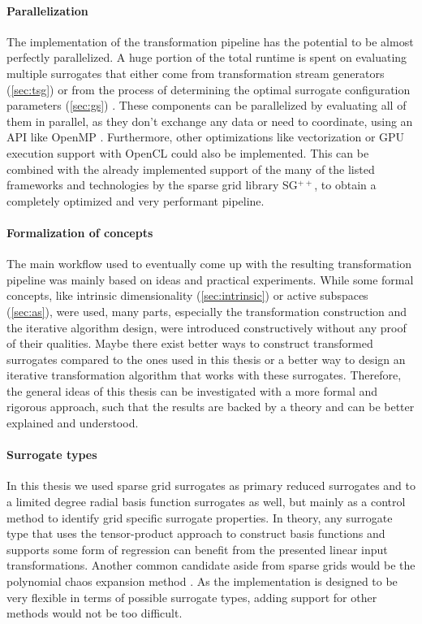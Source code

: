 \documentclass[
  a4paper,  %
  twoside,  %
  bibliography=totoc,
  headsepline,
  cleardoublepage=empty,
  parskip=half,
  draft=false
]{scrbook}
\begin{document}
\paragraph{Parallelization}
The implementation of the transformation pipeline has the potential to be almost perfectly parallelized.
A huge portion of the total runtime is spent on evaluating multiple surrogates that either come from transformation stream generators (\cref{sec:tsg}) or from the process of determining the optimal surrogate configuration parameters (\cref{sec:gs}) .
These components can be parallelized by evaluating all of them in parallel, as they don't exchange any data or need to coordinate, using an API like OpenMP \cite{openmp08}.
Furthermore, other optimizations like vectorization \cite{Maleki2011} or GPU execution support with OpenCL \cite{Stone2010} could also be implemented.
This can be combined with the already implemented support of the many of the listed frameworks and technologies by the sparse grid library SG$^{++}$, to obtain a completely optimized and very performant pipeline.

\paragraph{Formalization of concepts}
The main workflow used to eventually come up with the resulting transformation pipeline was mainly based on ideas and practical experiments.
While some formal concepts, like intrinsic dimensionality (\cref{sec:intrinsic}) or active subspaces (\cref{sec:as}), were used, many parts, especially the transformation construction and the iterative algorithm design, were introduced constructively without any proof of their qualities.
Maybe there exist better ways to construct transformed surrogates compared to the ones used in this thesis or a better way to design an iterative transformation algorithm that works with these surrogates.
Therefore, the general ideas of this thesis can be investigated with a more formal and rigorous approach, such that the results are backed by a theory and can be better explained and understood.

\paragraph{Surrogate types}
In this thesis we used sparse grid surrogates as primary reduced surrogates and to a limited degree radial basis function surrogates as well, but mainly as a control method to identify grid specific surrogate properties.
In theory, any surrogate type that uses the tensor-product approach to construct basis functions and supports some form of regression can benefit from the presented linear input transformations.
Another common candidate aside from sparse grids would be the polynomial chaos expansion method \cite{Crestaux2009}.
As the implementation is designed to be very flexible in terms of possible surrogate types, adding support for other methods would not be too difficult.
\end{document}
